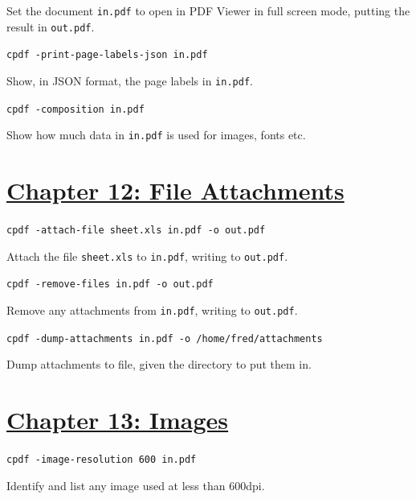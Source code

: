 \documentclass{book}
\begin{document}
\noindent Set the document \texttt{in.pdf} to open in PDF Viewer in full screen mode, putting the result in \texttt{out.pdf}.

\begin{framed}\noindent\texttt{cpdf -print-page-labels-json in.pdf}\end{framed}

\noindent Show, in JSON format, the page labels in \texttt{in.pdf}.

\begin{framed}\noindent\texttt{cpdf -composition in.pdf}\end{framed}

\noindent Show how much data in \texttt{in.pdf} is used for images, fonts etc.

\section*{\hyperref[chap:12]{Chapter 12: File Attachments}}

\begin{framed}\noindent\texttt{cpdf -attach-file sheet.xls in.pdf -o out.pdf}\end{framed}

\noindent Attach the file \texttt{sheet.xls} to \texttt{in.pdf}, writing to \texttt{out.pdf}.

\begin{framed}\noindent\texttt{cpdf -remove-files in.pdf -o out.pdf}\end{framed}

\noindent Remove any attachments from \texttt{in.pdf}, writing to \texttt{out.pdf}.

\begin{framed}\noindent\texttt{cpdf -dump-attachments in.pdf -o /home/fred/attachments}\end{framed}

\noindent Dump attachments to file, given the directory to put them in.

\section*{\hyperref[chap:13]{Chapter 13: Images}}

\begin{framed}\noindent\texttt{cpdf -image-resolution 600 in.pdf}\end{framed}

\noindent Identify and list any image used at less than 600dpi.
\end{document}
